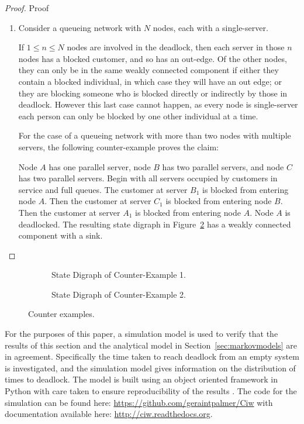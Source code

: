 \documentclass{article}
\numberwithin{equation}{section}
\begin{document}
\begin{proof}{Proof}
\begin{enumerate}
  \item
  Consider a queueing network with $N$ nodes, each with a single-server.

  If $1 \leq n \leq N$ nodes are involved in the deadlock, then each server in
  those $n$ nodes has a blocked customer, and so has an out-edge.
  Of the other nodes, they can only be in the same weakly connected component
  if either they contain a blocked individual, in which case they will have an
  out edge; or they are blocking someone who is blocked directly or indirectly
  by those in deadlock.
  However this last case cannot happen, as every node is single-server each
  person can only be blocked by one other individual at a time.

  For the case of a queueing network with more than two nodes with multiple
  servers, the following counter-example proves the claim:

  Node $A$ has one parallel server, node $B$ has two parallel servers, and
  node $C$ has two parallel servers.
  Begin with all servers occupied by customers in service and full queues.
  The customer at server $B_1$ is blocked from entering node $A$.
  Then the customer at server $C_1$ is blocked from entering node $B$.
  Then the customer at server $A_1$ is blocked from entering node $A$.
  Node $A$ is deadlocked.
  The resulting state digraph in Figure~\ref{fig:counter_example_2} has a
  weakly connected component with a sink.
  \end{enumerate}
\end{proof}

\begin{figure}
\begin{subfigure}{0.5\textwidth}
\begin{center}

\end{center}
\caption{State Digraph of Counter-Example 1.}
\label{fig:counter_example_1}
\end{subfigure}
\begin{subfigure}{0.5\textwidth}
\begin{center}

\end{center}
\caption{State Digraph of Counter-Example 2.}
\label{fig:counter_example_2}
\end{subfigure}
\caption{Counter examples.}
\label{fig:counter_examples}
\end{figure}


For the purposes of this paper, a simulation model is used to verify that the
results of this section and the analytical model in
Section~\ref{sec:markovmodels} are in agreement.
Specifically the time taken to reach deadlock from an empty system is
investigated, and the simulation model gives information on the distribution
of times to deadlock.
The model is built using an object oriented framework in Python
\cite{python13} with care taken to ensure reproducibility of the results
\cite{hongetal15}.
The code for the simulation can be found here:
\url{https://github.com/geraintpalmer/Ciw} with documentation available here:
\url{http://ciw.readthedocs.org}.
\end{document}

